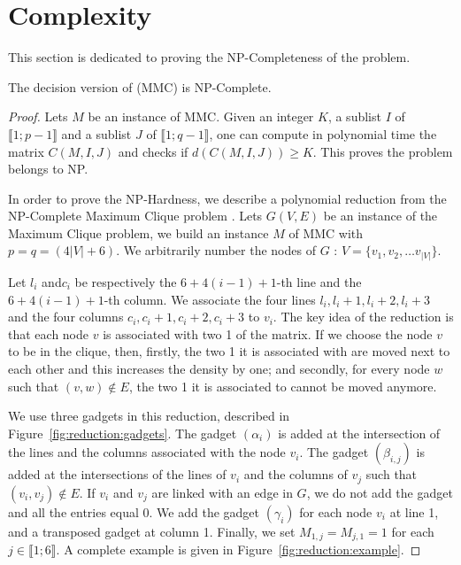 \section{Complexity}
\label{sect:complexity}
 
This section is dedicated to proving the NP-Completeness of the problem.

  \begin{theorem}
  \label{theo:complexity}
  The decision version of (MMC) is NP-Complete.
  \end{theorem}
  \begin{proof}
 

    Lets $M$ be an instance of MMC. Given an integer $K$, a sublist $I$ of $\llbracket 1; p-1 \rrbracket$ and a sublist $J$ of $\llbracket 1; q-1 \rrbracket$, one can compute in polynomial time the matrix $C(M,I,J)$ and checks if $d(C(M,I,J)) \geq K$. This proves the problem belongs to NP.

    In order to prove the NP-Hardness, we describe a polynomial reduction from the NP-Complete Maximum Clique problem \cite{Karp1972}. Lets $G(V,E)$ be an instance of the Maximum Clique problem, we build an instance $M$ of MMC with $p = q = (4|V| + 6)$. We arbitrarily number the nodes of $G$ : $V = \{v_1, v_2, \dots v_{|V|}\}$.

    Let $l_i$ and$c_i$ be respectively the $6+4(i-1)+1$-th line and the $6+4(i-1)+1$-th column. We associate the four lines $l_i, l_i+1, l_i+2, l_i+3$ and the four columns $c_i, c_i +1, c_i+2, c_i + 3$ to $v_i$. The key idea of the reduction is that each node $v$ is associated with two 1 of the matrix. If we choose the node $v$ to be in the clique, then, firstly, the two 1 it is associated with are moved next to each other and this increases the density by one; and secondly, for every node $w$ such that $(v,w) \not\in E$, the two 1 it is associated to cannot be moved anymore.

    We use three gadgets in this reduction, described in Figure~\ref{fig:reduction:gadgets}. The gadget $(\alpha_i)$ is added at the intersection of the lines and the columns associated with the node $v_i$. The gadget $(\beta_{i,j})$ is added at the intersections of the lines of $v_i$ and the columns of $v_j$ such that $(v_i,v_j) \not\in E$. If $v_i$ and $v_j$ are linked with an edge in $G$, we do not add the gadget and all the entries equal 0. We add the gadget $(\gamma_i)$ for each node $v_i$ at line 1, and a transposed gadget at column 1. Finally, we set $M_{1,j} = M_{j,1} = 1$ for each $j \in \llbracket 1;6 \rrbracket$. A complete example is given in Figure~\ref{fig:reduction:example}.


\end{proof}

